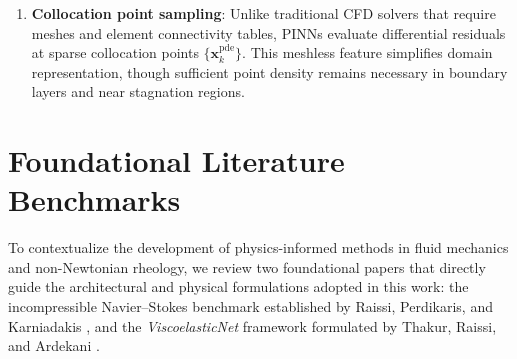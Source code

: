 \begin{enumerate}
    \item \textbf{Collocation point sampling}:
    Unlike traditional CFD solvers that require meshes and element connectivity tables,
    PINNs evaluate differential residuals at sparse collocation points $\{ \boldsymbol{x}_k^{\mathrm{pde}} \}$.
    This meshless feature simplifies domain representation,
    though sufficient point density remains necessary in boundary layers and near stagnation regions.
\end{enumerate}

\begin{table}[htbp] %
    \centering
    \caption{Comparison of differentiation paradigms in scientific computing and deep learning.}
    \label{tab:differentiation_comparison}
\end{table}

\section{Foundational Literature Benchmarks}
\label{sec:literature_benchmarks}

To contextualize the development of physics-informed methods in fluid mechanics
and non-Newtonian rheology, we review two foundational papers that directly
guide the architectural and physical formulations adopted in this work: the
incompressible Navier--Stokes benchmark established by Raissi, Perdikaris, and
Karniadakis \cite{raissi2019physics}, and the \textit{ViscoelasticNet} framework
formulated by Thakur, Raissi, and Ardekani \cite{thakur2024viscoelasticnet}.

